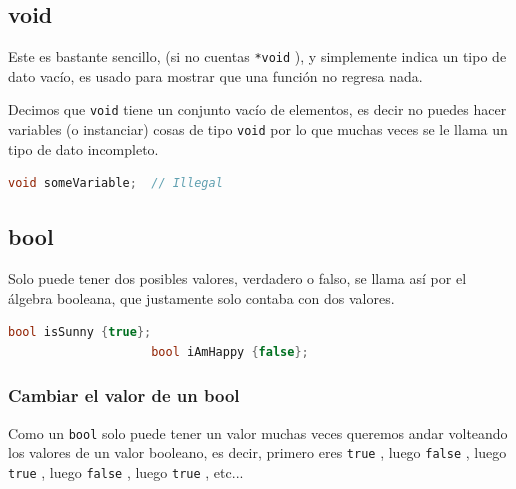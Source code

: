 \documentclass[12pt, fleqn]{report}                             %
\theoremstyle{break}                                            %
\newcommand{\textCode}[1]  { \texttt{#1} }                      %
\begin{document}
            \subsection{void}

                Este es bastante sencillo, (si no cuentas \textCode{*void}), y simplemente indica
                un tipo de dato vacío, es usado para mostrar que una función no regresa nada.
               
                Decimos que \textCode{void} tiene un conjunto vacío de elementos, es decir no puedes hacer
                variables (o instanciar) cosas de tipo  \textCode{void} por lo que muchas veces
                se le llama un tipo de dato incompleto.
                \begin{lstlisting}[language=C++, gobble=20]
                    void someVariable;  // Illegal
                \end{lstlisting}

            \subsection{bool}

                Solo puede tener dos posibles valores, verdadero o falso, se llama así por el álgebra
                booleana, que justamente solo contaba con dos valores.
                \begin{lstlisting}[language=C++, gobble=20]
                    bool isSunny {true};
                    bool iAmHappy {false};
                \end{lstlisting}

                \subsubsection{Cambiar el valor de un bool}

                    Como un \textCode{bool} solo puede tener un valor muchas veces queremos andar volteando
                    los valores de un valor booleano, es decir, primero eres \textCode{true}, luego
                    \textCode{false}, luego \textCode{true}, luego \textCode{false}, luego \textCode{true}, 
                    etc...
\end{document}
